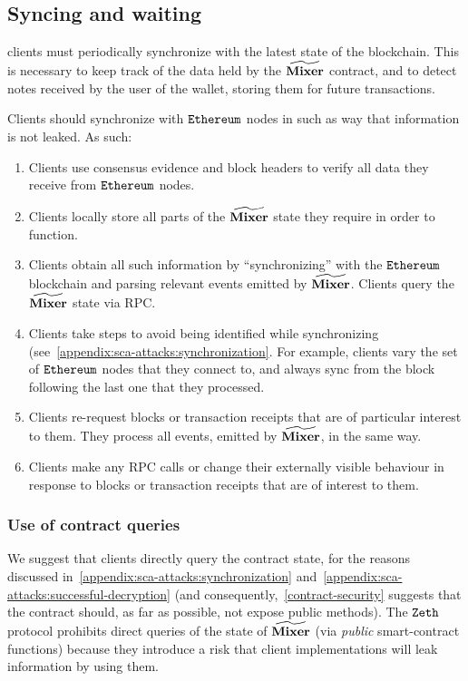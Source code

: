 \subsection{Syncing and waiting}\label{client-security:syncing}

\zeth{} clients must periodically synchronize with the latest state of the blockchain. This is necessary to keep track of the data held by the $\widetilde{\mathbf{Mixer}}$ contract, and to detect notes received by the user of the wallet, storing them for future transactions.

Clients should synchronize with $\texttt{Ethereum}{}$ nodes in such as way that information is not leaked. As such:
\begin{enumerate}
    \item Clients \MUST{} use consensus evidence and block headers to verify all data they receive from $\texttt{Ethereum}{}$ nodes.
    \item Clients \MUST{} locally store all parts of the $\widetilde{\mathbf{Mixer}}$ state they require in order to function.
    \item Clients \MUST{} obtain all such information by ``synchronizing'' with the $\texttt{Ethereum}{}$ blockchain and parsing relevant events emitted by $\widetilde{\mathbf{Mixer}}$. Clients \MUSTNOT{} query the $\widetilde{\mathbf{Mixer}}$ state via RPC.
    \item Clients \SHOULD{} take steps to avoid being identified while synchronizing (see~\cref{appendix:sca-attacks:synchronization}. For example, clients \SHOULD{} vary the set of $\texttt{Ethereum}{}$ nodes that they connect to, and \SHOULDNOT{} always sync from the block following the last one that they processed.
    \item Clients \SHOULDNOT{} re-request blocks or transaction receipts that are of particular interest to them. They \SHOULD{} process all events, emitted by $\widetilde{\mathbf{Mixer}}$, in the same way.
    \item Clients \SHOULDNOT{} make any RPC calls or change their externally visible behaviour in response to blocks or transaction receipts that are of interest to them.
\end{enumerate}

\subsubsection{Use of contract queries}\label{client-security:syncing:client-queries}

We suggest that clients \SHOULDNOT{} directly query the contract state, for the reasons discussed in~\cref{appendix:sca-attacks:synchronization} and~\cref{appendix:sca-attacks:successful-decryption} (and consequently,~\cref{contract-security} suggests that the \mixer{} contract should, as far as possible, not expose public methods). The $\texttt{Zeth}{}$ protocol prohibits direct queries of the state of $\widetilde{\mathbf{Mixer}}{}$ (via \emph{public} smart-contract functions) because they introduce a risk that client implementations will leak information by using them.

